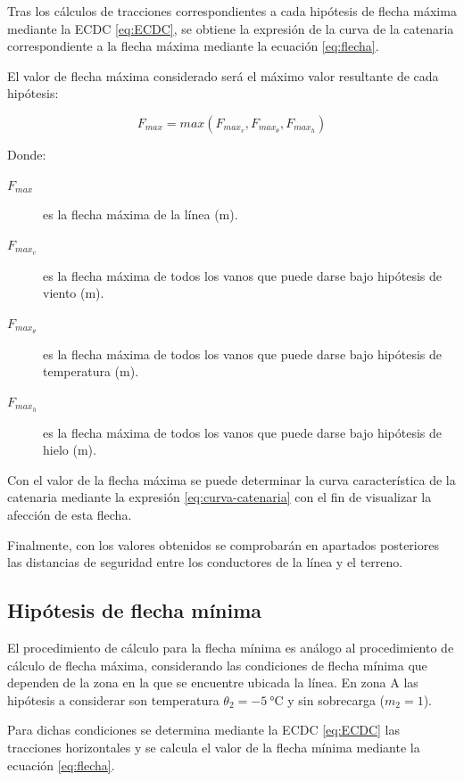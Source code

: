 Tras los cálculos de tracciones correspondientes a cada hipótesis de flecha máxima mediante la \ac{ECDC} \eqref{eq:ECDC}, se obtiene la expresión de la curva de la catenaria correspondiente a la flecha máxima mediante la ecuación \eqref{eq:flecha}.

El valor de flecha máxima considerado será el máximo valor resultante de cada hipótesis:

\begin{equation}
    F_{max}= max(F_{max_{v}},F_{max_{\theta}},F_{max_{h}})
    \label{eq:flecha-maxima}
\end{equation}

Donde:
\begin{description}
    \item[$F_{max}$] es la flecha máxima de la línea (\si{\meter}).
    \item[$F_{max_{v}}$] es la flecha máxima de todos los vanos que puede darse bajo hipótesis de viento (\si{\meter}).
    \item[$F_{max_{\theta}}$] es la flecha máxima de todos los vanos que puede darse bajo hipótesis de temperatura (\si{\meter}).
    \item[$F_{max_{h}}$] es la flecha máxima de todos los vanos que puede darse bajo hipótesis de hielo (\si{\meter}).
\end{description}

Con el valor de la flecha máxima se puede determinar la curva característica de la catenaria mediante la expresión \eqref{eq:curva-catenaria} con el fin de visualizar la afección de esta flecha.

Finalmente, con los valores obtenidos se comprobarán en apartados posteriores las distancias de seguridad entre los conductores de la línea y el terreno. 

\subsection{Hipótesis de flecha mínima}
\label{subsec:cm-hipotesisFmin}
El procedimiento de cálculo para la flecha mínima es análogo al procedimiento de cálculo de flecha máxima, considerando las condiciones de flecha mínima que dependen de la zona en la que se encuentre ubicada la línea. En zona A las hipótesis a considerar son temperatura  $\theta_2=\SI{-5}{\celsius}$ y sin sobrecarga ($m_2=1$).

Para dichas condiciones se determina mediante la \ac{ECDC} \eqref{eq:ECDC} las tracciones horizontales y se calcula el valor de la flecha mínima mediante la ecuación \eqref{eq:flecha}.

